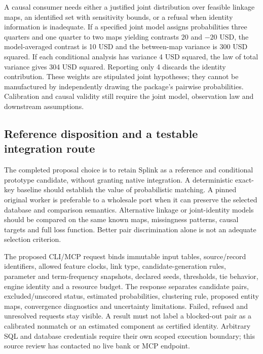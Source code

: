 A causal consumer needs either a justified joint distribution over feasible linkage maps, an identified set with sensitivity bounds, or a refusal when identity information is inadequate. If a specified joint model assigns probabilities three quarters and one quarter to two maps yielding contrasts $20$ and $-20$ USD, the model-averaged contrast is 10 USD and the between-map variance is 300 USD squared. If each conditional analysis has variance 4 USD squared, the law of total variance gives 304 USD squared. Reporting only 4 discards the identity contribution. These weights are stipulated joint hypotheses; they cannot be manufactured by independently drawing the package's pairwise probabilities. Calibration and causal validity still require the joint model, observation law and downstream assumptions.~\citep{exec24_splink_contract}

\subsection{Reference disposition and a testable integration route}
The completed proposal choice is to retain Splink as a reference and conditional prototype candidate, without granting native integration. A deterministic exact-key baseline should establish the value of probabilistic matching. A pinned original worker is preferable to a wholesale port when it can preserve the selected database and comparison semantics. Alternative linkage or joint-identity models should be compared on the same known maps, missingness patterns, causal targets and full loss function. Better pair discrimination alone is not an adequate selection criterion.~\citep{exec24_splink_contract}

The proposed CLI/MCP request binds immutable input tables, source/record identifiers, allowed feature clocks, link type, candidate-generation rules, parameter and term-frequency snapshots, declared seeds, thresholds, tie behavior, engine identity and a resource budget. The response separates candidate pairs, excluded/unscored status, estimated probabilities, clustering rule, proposed entity maps, convergence diagnostics and uncertainty limitations. Failed, refused and unresolved requests stay visible. A result must not label a blocked-out pair as a calibrated nonmatch or an estimated component as certified identity. Arbitrary SQL and database credentials require their own scoped execution boundary; this source review has contacted no live bank or MCP endpoint.~\citep{exec24_splink_contract}

